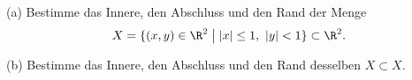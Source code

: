 \begin{prob}
(a) Bestimme das Innere, den Abschluss und den Rand der Menge
$$X=\{(x,y)\in\R^2\;\bigl|\;|x|\leq 1,\ |y|<1\}\subset\R^2.$$

(b) Bestimme das Innere, den Abschluss und den Rand desselben $X\subset X$.
\end{prob}
